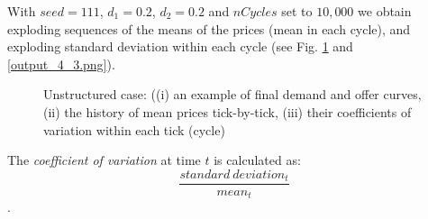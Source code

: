 \documentclass[10pt]{report}
\begin{document}
With $seed=111$, $d_1=0.2$, $d_2=0.2$ and $nCycles$ set to $10,000$ we obtain exploding sequences of the means of the prices (mean in each cycle), and exploding standard deviation within each cycle (see Fig. \ref{output_4_2.png} and \ref{output_4_3.png}).

\begin{figure}[H]
\begin{center}
\caption{Unstructured case: ((i) an example of final demand and offer curves, (ii) the history of mean prices tick-by-tick, (iii) their coefficients of variation within each tick (cycle)}
\label{output_4_2.png}
\end{center}
\end{figure}

The \emph{coefficient of variation} at time $t$ is calculated as: $$\frac{standard~deviation_t}{mean_t}$$.
\end{document}
